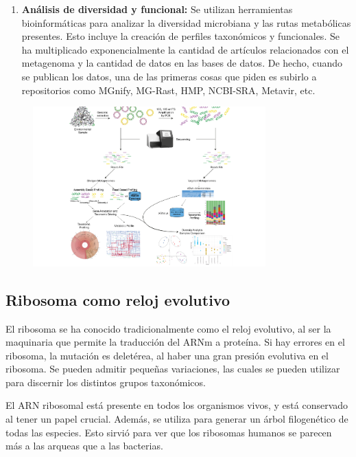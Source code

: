 \begin{enumerate}
\item \textbf{Análisis de diversidad y funcional:} Se utilizan herramientas bioinformáticas para analizar la diversidad microbiana y las rutas metabólicas presentes. Esto incluye la creación de perfiles taxonómicos y funcionales. Se ha multiplicado exponencialmente la cantidad de artículos relacionados con el metagenoma y la cantidad de datos en las bases de datos. De hecho, cuando se publican los datos, una de las primeras cosas que piden es subirlo a repositorios como MGnify, MG-Rast, HMP, NCBI-SRA, Metavir, etc.
\end{enumerate}

\begin{figure}[h]
\centering
\includegraphics[width = 0.8\textwidth]{figs/metagenomic-pipeline.png}
\end{figure}

\subsection{Ribosoma como reloj evolutivo}
El ribosoma se ha conocido tradicionalmente como el reloj evolutivo, al ser la maquinaria que permite la traducción del ARNm a proteína. Si hay errores en el ribosoma, la mutación es deletérea, al haber una gran presión evolutiva en el ribosoma. Se pueden admitir pequeñas variaciones, las cuales se pueden utilizar para discernir los distintos grupos taxonómicos. 

El ARN ribosomal está presente en todos los organismos vivos, y está conservado al tener un papel crucial. Además, se utiliza para generar un árbol filogenético de todas las especies. Esto sirvió para ver que los ribosomas humanos se parecen más a las arqueas que a las bacterias.

